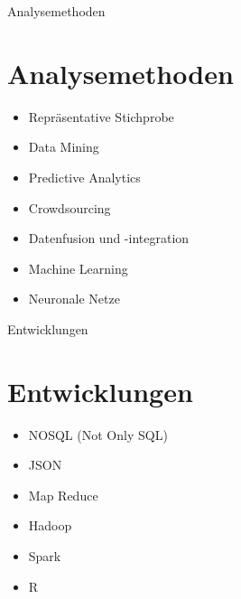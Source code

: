 \documentclass[11pt]{beamer}
\begin{document}
\begin{frame}{Analysemethoden}
\section{Analysemethoden}
\begin{itemize}
\item Repräsentative Stichprobe
\item Data Mining
\item Predictive Analytics
\item Crowdsourcing
\item Datenfusion und -integration
\item Machine Learning
\item Neuronale Netze
\end{itemize}
\end{frame}

\begin{frame}{Entwicklungen}
\section{Entwicklungen}
	\begin{itemize}
	\item NOSQL (Not Only SQL)
	\item JSON 
	\item Map Reduce
	\item Hadoop
	\item Spark
	\item R
	\end{itemize}
\end{frame}



%
\end{document}
